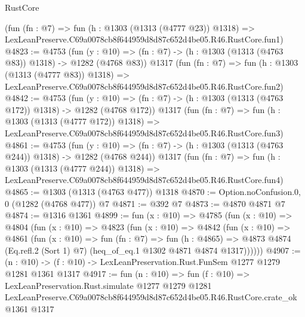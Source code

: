 \begin{lexlean}{RustCore}
\begin{coremodule}
    (fun (fn : @7) =>
    fun (h : @1303 (@1313 (@4777 @23)) @1318) =>
    LexLeanPreserve.C69a0078cb8f644959d8d87c652d4be05.R46.RustCore.fun1)
@4823 := @4753
    (fun (y : @10) => (fn : @7) -> (h : @1303 (@1313 (@4763 @83)) @1318) -> @1282 (@4768 @83))
    @1317
    (fun (fn : @7) =>
    fun (h : @1303 (@1313 (@4777 @83)) @1318) =>
    LexLeanPreserve.C69a0078cb8f644959d8d87c652d4be05.R46.RustCore.fun2)
@4842 := @4753
    (fun (y : @10) => (fn : @7) -> (h : @1303 (@1313 (@4763 @172)) @1318) -> @1282 (@4768 @172))
    @1317
    (fun (fn : @7) =>
    fun (h : @1303 (@1313 (@4777 @172)) @1318) =>
    LexLeanPreserve.C69a0078cb8f644959d8d87c652d4be05.R46.RustCore.fun3)
@4861 := @4753
    (fun (y : @10) => (fn : @7) -> (h : @1303 (@1313 (@4763 @244)) @1318) -> @1282 (@4768 @244))
    @1317
    (fun (fn : @7) =>
    fun (h : @1303 (@1313 (@4777 @244)) @1318) =>
    LexLeanPreserve.C69a0078cb8f644959d8d87c652d4be05.R46.RustCore.fun4)
@4865 := @1303 (@1313 (@4763 @477)) @1318
@4870 := Option.noConfusion.{0, 0} (@1282 (@4768 @477)) @7
@4871 := @392 @7
@4873 := @4870 @4871 @7
@4874 := @1316 @1361
@4899 := fun (x : @10) =>
  @4785
    (fun (x : @10) =>
    @4804
      (fun (x : @10) =>
      @4823
        (fun (x : @10) =>
        @4842
          (fun (x : @10) =>
          @4861
            (fun (x : @10) =>
            fun (fn : @7) =>
            fun (h : @4865) =>
            @4873 @4874 (Eq.refl.{2} (Sort 1) @7) (heq_of_eq.{1} @1302 @4871 @4874 @1317))))))
@4907 := (n : @10) -> (f : @10) -> LexLeanPreservation.Rust.FunSem @1277 @1279 @1281 @1361 @1317
@4917 := fun (n : @10) =>
  fun (f : @10) =>
  LexLeanPreservation.Rust.simulate
    @1277
    @1279
    @1281
    LexLeanPreserve.C69a0078cb8f644959d8d87c652d4be05.R46.RustCore.crate_ok
    @1361
    @1317
\end{coremodule}
\end{lexlean}
